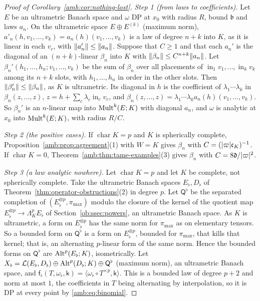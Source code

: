 \begin{proof}[Proof of Corollary~\ref{amb:cor:nothing-lost}]
\emph{Step 1 (from laws to coefficients).} Let $E$ be an ultrametric Banach space and $\omega$ DP at $x_0$ with radius $R$, bound $\mathfrak b$ and laws $a_n$. On the ultrametric space $E\oplus E^{(k)}$ (maximum norm), $a'_n(h,v_1,\dots,v_k)=a_n(h)(v_1,\dots,v_k)$ is a law of degree $n+k$ into $K$, as it is linear in each $v_c$, with $\lVert a_n'\rVert\le\lVert a_n\rVert$. Suppose that $C\ge1$ and that each $a_n'$ is the diagonal of an $(n+k)$-linear $\beta_n$ into $K$ with $\lVert \beta_n\rVert\le C^{n+k}\lVert a_n\rVert$. Let $\beta_n'(h_1,\dots,h_n;v_1,\dots,v_k)$ be the sum of $\beta_n$ over all placements of $\operatorname{in}_1v_1,\dots,\operatorname{in}_kv_k$ among its $n+k$ slots, with $h_1,\dots,h_n$ in order in the other slots. Then $\lVert \beta_n'\rVert\le\lVert \beta_n\rVert$, as $K$ is ultrametric. Its diagonal in $h$ is the coefficient of $\lambda_1\cdots\lambda_k$ in $\beta_n(z,\dots,z)$, $z=h+\sum_c\lambda_c\operatorname{in}_cv_c$, and $\beta_n(z,\dots,z)=\lambda_1\cdots\lambda_ka_n(h)(v_1,\dots,v_k)$. So $\beta_n'$ is an $n$-linear map into $\operatorname{Mult}^k(E;K)$ with diagonal $a_n$, and $\omega$ is analytic at $x_0$ into $\operatorname{Mult}^k(E;K)$, with radius $R/C$.

\emph{Step 2 (the positive cases).} If $\operatorname{char}K=p$ and $K$ is spherically complete, Proposition~\ref{amb:prop:agreement}(1) with $W=K$ gives $\beta_n$ with $C=(\lvert \varpi\rvert\mathfrak c_K)^{-1}$. If $\operatorname{char}K=0$, Theorem~\ref{amb:thm:tame-examples}(3) gives $\beta_n$ with $C=8\mathfrak d/\lvert \varpi\rvert^2$.

\emph{Step 3 (a law analytic nowhere).} Let $\operatorname{char}K=p$ and let $K$ be complete, not spherically complete. Take the ultrametric Banach spaces $E_\flat,D_\flat$ of Theorem~\ref{thm:operator-obstructions}(2) in degree $p$. Let $\mathsf Q^\flat$ be the separated completion of $(E_\flat^{\otimes p},\pi_{\max})$ modulo the closure of the kernel of the quotient map $E_\flat^{\otimes p}\to\Lambda^p_KE_\flat$ of Section~\ref{ob:ssec:powers}, an ultrametric Banach space. As $K$ is ultrametric, a form on $E_\flat^{\otimes p}$ has the same norm for $\pi_{\max}$ as on elementary tensors. So a bounded form on $\mathsf Q^\flat$ is a form on $E_\flat^{\otimes p}$, bounded for $\pi_{\max}$, that kills that kernel; that is, an alternating $p$-linear form of the same norm. Hence the bounded forms on $\mathsf Q^\flat$ are $\operatorname{Alt}^p(E_\flat;K)$, isometrically. Let $X_\flat=\mathcal L(E_\flat,D_\flat)\oplus\operatorname{Alt}^p(D_\flat;K)\oplus\mathsf Q^\flat$ (maximum norm), an ultrametric Banach space, and $\mathsf f_\flat(T,\omega_\flat,\mathsf k)=\langle\omega_\flat\circ T^{\times p},\mathsf k\rangle$. This is a bounded law of degree $p+2$ and norm at most $1$, the coefficients in $T$ being alternating by interpolation, so it is DP at every point by \eqref{amb:eq:binomial}.


\end{proof}
